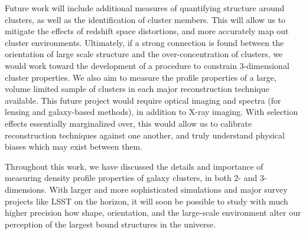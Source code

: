 Future work will include additional measures of quantifying structure around
clusters, as well as the identification of cluster members. This will allow us
to mitigate the effects of redshift space distortions, and more accurately map
out cluster environments. Ultimately, if a strong connection is found between
the orientation of large scale structure and the over-concentration of clusters, we
would work toward the development of a procedure to constrain 3-dimensional
cluster properties. We also aim to measure the profile properties of a
large, volume limited sample of clusters in each major reconstruction technique
available. This future project would require optical imaging and spectra
(for lensing and galaxy-based methods), in addition to X-ray imaging. With selection
effects essentially marginalized over, this would allow us to calibrate reconstruction
techniques against one another, and truly understand physical biases which may
exist between them.

Throughout this work, we have discussed the details and importance of measuring
density profile properties of galaxy clusters, in both 2- and
3-dimensions. With larger and more sophisticated simulations and major survey
projects like LSST on the horizon, it will soon be possible to study with much
higher precision how shape, orientation, and the large-scale environment alter
our perception of the largest bound structures in the universe.

